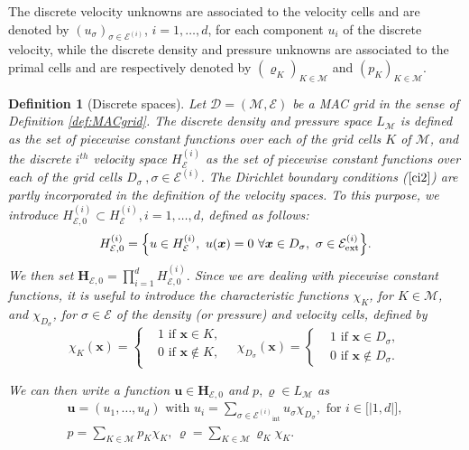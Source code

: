 \documentclass{amsart}
\newtheorem{df}{Definition}
\numberwithin{equation}{section}
\begin{document}
The discrete velocity unknowns are associated to the velocity cells and are denoted by $(u_{{\sigma}})_{{{\sigma}}\in{\mathcal {E}^{(i)}}}$, $i=1,\ldots, d$, for each component $u_i$ of the discrete velocity, while the discrete density and pressure unknowns are associated to the primal cells and are respectively denoted by $({\varrho}_{K})_{K\in{{\mathcal M}}}$ and $(p_{K})_{K\in{{\mathcal M}}}$.
\begin{df}[Discrete spaces]
\label{discretespace}
Let $\mathcal{D}=({{\mathcal M}},{{\mathcal E}})$ be a MAC grid in the sense of Definition \ref{def:MACgrid}. 
The discrete density and pressure space $L_{{\mathcal M}}$ is defined as the set of piecewise constant functions over each of the grid cells $K$ of ${{\mathcal M}}$, and  the discrete $i^{th}$ velocity space ${H_{{\mathcal E}}^{(i)}}$ as the set of piecewise constant functions over each of the grid cells $D_{{\sigma}}~,{{\sigma}}\in{\mathcal {E}^{(i)}}$.
The Dirichlet boundary conditions ($\ref{ci2}$) are partly incorporated in the definition of the velocity spaces.
To this purpose, we introduce ${H_{{{\mathcal E}},0}^{(i)}} \subset {H_{{\mathcal E}}^{(i)}}, i=1,\ldots,d$, defined as follows:
\[
 {H_{{{\mathcal E}},0}^{(i)}}=\Bigl\{u\in{H_{{\mathcal E}}^{(i)}}, \ u({{\boldsymbol x}})=0\ \forall {{\boldsymbol x}}\in D_{{\sigma}},\ {{\sigma}} \in {{\mathcal E}_{\mathrm{ext}}^{(i)}} \Bigr\}.
\]
We then set ${{\mathbf{H}_{{{\mathcal E}},0}}} =  \prod_{i=1}^d  {H_{{{\mathcal E}},0}^{(i)}}.$ 
Since we are dealing with piecewise constant functions, it is useful to introduce the characteristic functions $\chi_K$, for $K \in {{\mathcal M}}$, and $\chi_{D_{{\sigma}}}$, for ${{\sigma}} \in {{\mathcal E}}$ of the density (or pressure) and velocity cells, defined by 
\[
 \chi_K({{\boldsymbol x}}) = \begin{cases}
                 &1  \text{ if } {{\boldsymbol x}} \in K,\\ &0  \text{ if } {{\boldsymbol x}} \not \in K,\\
                \end{cases} 
\quad \chi_{D_{{\sigma}}}({{\boldsymbol x}}) = \begin{cases}
                  &1  \text{ if } {{\boldsymbol x}} \in D_{{\sigma}},\\ &0  \text{ if } {{\boldsymbol x}} \not \in D_{{\sigma}}.
                \end{cases} 
\]

We can then write a function ${{\boldsymbol u}} \in {{\mathbf{H}_{{{\mathcal E}},0}}}$ and $p, {\varrho} \in L_{{\mathcal M}}$ as
\begin{align*}
{{\boldsymbol u}} = (u_1,\ldots,u_d) \mbox{ with } u_i =  \displaystyle \sum_{{{\sigma}}\in {\mathcal {E}^{(i)}}_\operatorname{int}} u_{{\sigma}}\chi_{D_{{\sigma}}},
\mbox{ for } i \in {[ \! \!\vert } 1, d {\vert \! \! ]},
\\
p = \displaystyle \sum_{K \in {{\mathcal M}}} p_K\chi_{K}, \, {\varrho} = \displaystyle \sum_{K \in {{\mathcal M}}} {\varrho}_K\chi_{K}.
\end{align*}
\end{df}
\end{document}
